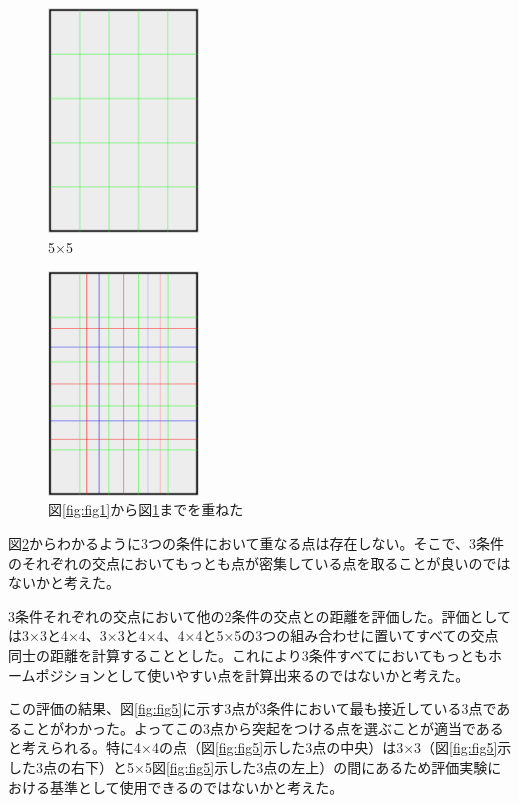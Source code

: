 \documentclass[11pt,a4paper]{jarticle}
\begin{document}
\begin{figure}[H]
  \begin{center}
  \includegraphics[width=4cm]{fig/photo3.eps}
  \caption{5×5}
  \label{fig:fig3}
  \end{center}
\end{figure}

\begin{figure}[H]
  \begin{center}
  \includegraphics[width=4cm]{fig/photo4.eps}
  \caption{図\ref{fig:fig1}から図\ref{fig:fig3}までを重ねた}
  \label{fig:fig4}
  \end{center}
\end{figure}


図\ref{fig:fig4}からわかるように3つの条件において重なる点は存在しない。そこで、3条件のそれぞれの交点においてもっとも点が密集している点を取ることが良いのではないかと考えた。


3条件それぞれの交点において他の2条件の交点との距離を評価した。評価としては3×3と4×4、3×3と4×4、4×4と5×5の3つの組み合わせに置いてすべての交点同士の距離を計算することとした。これにより3条件すべてにおいてもっともホームポジションとして使いやすい点を計算出来るのではないかと考えた。


この評価の結果、図\ref{fig:fig5}に示す3点が3条件において最も接近している3点であることがわかった。よってこの3点から突起をつける点を選ぶことが適当であると考えられる。特に4×4の点（図\ref{fig:fig5}示した3点の中央）は3×3（図\ref{fig:fig5}示した3点の右下）と5×5図\ref{fig:fig5}示した3点の左上）の間にあるため評価実験における基準として使用できるのではないかと考えた。
\end{document}
